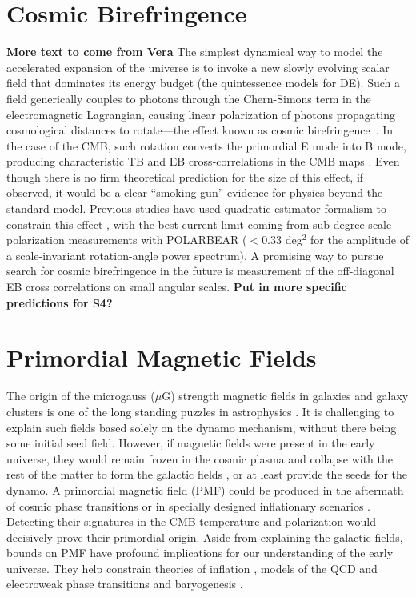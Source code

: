 \section{Cosmic Birefringence}
\textbf{More text to come from Vera}
The simplest dynamical way to model the accelerated expansion of the universe is to invoke a new slowly evolving scalar field that dominates its energy budget (the quintessence models for DE). Such a field generically couples to photons through the Chern-Simons term in the electromagnetic Lagrangian, causing linear polarization of photons propagating cosmological distances to rotate---the effect known as cosmic birefringence~\cite{1998PhRvL..81.3067C}. In the case of the CMB, such rotation converts the primordial E mode into B mode, producing characteristic TB and EB cross-correlations in the CMB maps \cite{2009PhRvL.102k1302K,2009PhRvD..80b3510G}. Even though there is no firm theoretical prediction for the size of this effect, if observed, it would be a clear “smoking-gun” evidence for physics beyond the standard model. Previous studies have used quadratic estimator formalism to constrain this effect \cite{2012PhRvD..86j3529G}, with the best current limit coming from sub-degree scale polarization measurements with POLARBEAR \cite{Ade:2015cao} ($<0.33$ deg$^2$ for the amplitude of a scale-invariant rotation-angle power spectrum). A promising way to pursue search for cosmic birefringence in the future is measurement of the off-diagonal EB cross correlations on small angular scales. {\bf Put in more specific predictions for S4?}

\section{Primordial Magnetic Fields}

The origin of the microgauss ($\mu$G) strength magnetic fields in galaxies and galaxy clusters is one of the long standing puzzles in astrophysics \cite{Durrer:2013pga}. It is challenging to explain such fields based solely on the dynamo mechanism, without there being some initial seed field. However, if magnetic fields were present in the early universe, they would remain frozen in the cosmic plasma and collapse with the rest of the matter to form the galactic fields \cite{Grasso:2000wj}, or at least provide the seeds for the dynamo. A primordial magnetic field (PMF) could be produced in the aftermath of cosmic phase transitions \cite{Vachaspati:1991nm} or in specially designed inflationary scenarios \cite{Turner:1987bw,Ratra:1991bn}. Detecting their signatures in the CMB temperature and polarization would decisively prove their primordial origin. Aside from explaining the galactic fields, bounds on PMF have profound implications for our understanding of the early universe.  They help constrain theories of inflation \cite{Bonvin:2011dt}, models of the QCD and electroweak phase transitions \cite{Caprini:2007xq} and baryogenesis \cite{Vachaspati:2001nb}.

